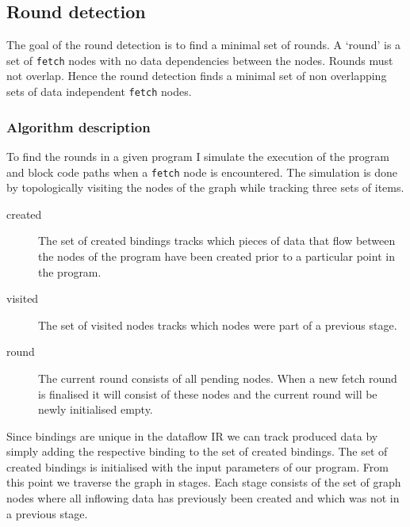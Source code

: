 \subsection{Round detection}

The goal of the round detection is to find a minimal set of rounds.
A `round' is a set of \texttt{fetch} nodes with no data dependencies between the nodes.
Rounds must not overlap.
Hence the round detection finds a minimal set of non overlapping sets of data independent \texttt{fetch} nodes.

\subsubsection{Algorithm description}

To find the rounds in a given program I simulate the execution of the program and block code paths when a \texttt{fetch} node is encountered.
The simulation is done by topologically visiting the nodes of the graph while tracking three sets of items.

\begin{description}
	\item[created] The set of created bindings tracks which pieces of data that flow between the nodes of the program have been created prior to a particular point in the program.
	\item[visited] The set of visited nodes tracks which nodes were part of a previous stage.
	\item[round] The current round consists of all pending \fetch{} nodes.
	When a new fetch round is finalised it will consist of these \fetch{} nodes and the current round will be newly initialised empty.
\end{description}

Since bindings are unique in the dataflow IR we can track produced data by simply adding the respective binding to the set of created bindings.
The set of created bindings is initialised with the input parameters of our program.
From this point we traverse the graph in stages.
Each stage consists of the set of graph nodes where all inflowing data has previously been created and which was not in a previous stage.

